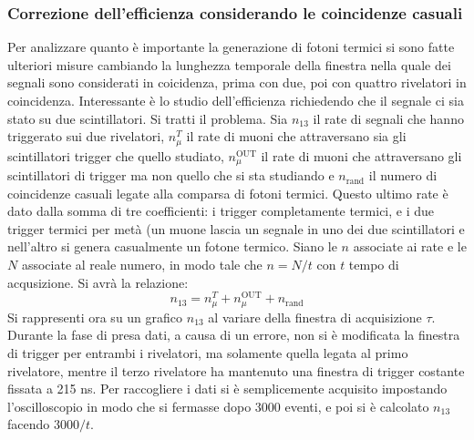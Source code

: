 \subsubsection{Correzione dell'efficienza considerando le coincidenze casuali}
\label{sec:eff_corr}
Per analizzare quanto è importante la generazione di fotoni termici si sono fatte ulteriori misure cambiando la lunghezza temporale della finestra nella quale dei segnali sono considerati in coicidenza, prima con due, poi con quattro rivelatori in coincidenza.
Interessante è lo studio dell'efficienza richiedendo che il segnale ci sia stato su due scintillatori. Si tratti il problema. Sia $n_{13}$ il rate di segnali che hanno triggerato sui due rivelatori, $n_\mu^T$ il rate di muoni che attraversano sia gli scintillatori trigger che quello studiato, $n_\mu^\text{OUT}$ il rate di muoni che attraversano gli scintillatori di trigger ma non quello che si sta studiando e $n_\text{rand}$ il numero di coincidenze casuali legate alla comparsa di fotoni termici. Questo ultimo rate è dato dalla somma di tre coefficienti: i trigger completamente termici, e i due trigger termici per metà (un muone lascia un segnale in uno dei due scintillatori e nell'altro si genera casualmente un fotone termico. Siano le $n$ associate ai rate e le $N$ associate al reale numero, in modo tale che $n=N/t$ con $t$ tempo di acqusizione. Si avrà la relazione:
\begin{equation}
  n_{13} = n_\mu^T + n_\mu^\text{OUT} + n_\text{rand}
\end{equation}
Si rappresenti ora su un grafico $n_{13}$ al variare della finestra di acquisizione $\tau$. Durante la fase di presa dati, a causa di un errore, non si è modificata la finestra di trigger per entrambi i rivelatori, ma solamente quella legata al primo rivelatore, mentre il terzo rivelatore ha mantenuto una finestra di trigger costante fissata a 215 ns. Per raccogliere i dati si è semplicemente acquisito impostando l'oscilloscopio in modo
che si fermasse dopo 3000 eventi, e poi si è calcolato $n_{13}$ facendo $3000/t$. %
